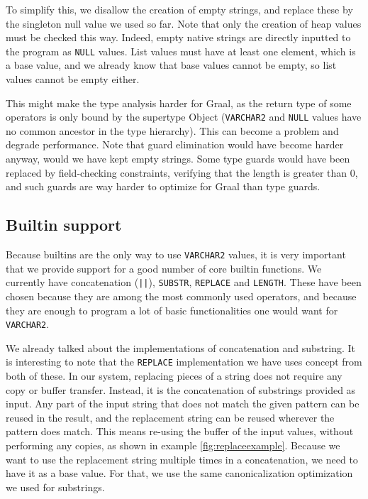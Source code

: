 \documentclass[twoside,11pt,a4paper]{article}
\newcommand{\java}[1]{\textsf{#1}}
\newcommand{\pls}[1]{\small\texttt{#1}\normalsize}
\newcommand{\plstype}[1]{\pls{#1}}
\newcommand{\varchar}{\plstype{VARCHAR2}}
\newcommand{\plsnull}{\pls{NULL}}
\begin{document}
To simplify this, we disallow the creation of empty strings, and replace these by the singleton null value we used so far. Note that only the creation of heap values must be checked this way. Indeed, empty native strings are directly inputted to the program as \plsnull{} values. List values must have at least one element, which is a base value, and we already know that base values cannot be empty, so list values cannot be empty either.

This might make the type analysis harder for Graal, as the return type of some operators is only bound by the supertype \java{Object} (\varchar{} and \plsnull{} values have no common ancestor in the type hierarchy). This can become a problem and degrade performance. Note that guard elimination would have become harder anyway, would we have kept empty strings. Some type guards would have been replaced by field-checking constraints, verifying that the length is greater than 0, and such guards are way harder to optimize for Graal than type guards.

\subsection{Builtin support}


Because builtins are the only way to use \varchar{} values, it is very important that we provide support for a good number of core builtin functions. We currently have concatenation (\pls{||}), \pls{SUBSTR}, \pls{REPLACE} and \pls{LENGTH}. These have been chosen because they are among the most commonly used operators, and because they are enough to program a lot of basic functionalities one would want for \varchar{}.

We already talked about the implementations of concatenation and substring. It is interesting to note that the \pls{REPLACE} implementation we have uses concept from both of these. In our system, replacing pieces of a string does not require any copy or buffer transfer. Instead, it is the concatenation of substrings provided as input. Any part of the input string that does not match the given pattern can be reused in the result, and the replacement string can be reused wherever the pattern does match. This means re-using the buffer of the input values, without performing any copies, as shown in example \ref{fig:replaceexample}. Because we want to use the replacement string multiple times in a concatenation, we need to have it as a base value. For that, we use the same canonicalization optimization we used for substrings.
\end{document}
